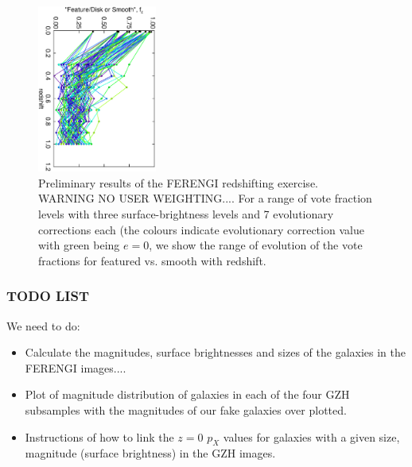 \documentclass[usenatbib]{mn2e}
\begin{document}
\begin{figure}
\begin{center}

\includegraphics[width=0.35\textwidth,angle=90]{somewhat_fake_results.ps}

\caption{Preliminary results of the FERENGI redshifting exercise. WARNING NO USER WEIGHTING.... For a range of vote fraction levels with three surface-brightness levels and 7 evolutionary corrections each (the colours indicate evolutionary correction value with green being $e=0$, we show the range of evolution of the vote fractions for featured vs. smooth with redshift.}

\label{fig:ferengi_results_fake}

\end{center}
\end{figure}

\subsubsection{TODO LIST}
We need to do: 
\begin{itemize}
\item Calculate the magnitudes, surface brightnesses and sizes of the galaxies in the FERENGI images....
\item Plot of magnitude distribution of galaxies in each of the four GZH subsamples with the magnitudes of our fake galaxies over plotted. 
\item Instructions of how to link the $z=0$ $p_X$ values for galaxies with a given size, magnitude (surface brightness) in the GZH images. 
\end{itemize}
\end{document}
